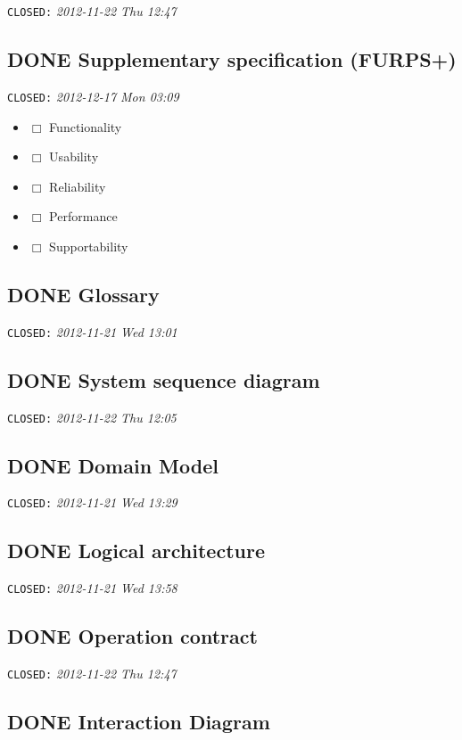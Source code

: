 \documentclass[11pt]{article}
\begin{document}
    \texttt{CLOSED:} \textit{2012-11-22 Thu 12:47}
\subsection{\textbf{DONE} Supplementary specification (FURPS+)}
\label{sec-1-3}

   \texttt{CLOSED:} \textit{2012-12-17 Mon 03:09}

\begin{itemize}
\item $\Box$ Functionality
\item $\Box$ Usability
\item $\Box$ Reliability
\item $\Box$ Performance
\item $\Box$ Supportability
\end{itemize}
\subsection{\textbf{DONE} Glossary}
\label{sec-1-4}

   \texttt{CLOSED:} \textit{2012-11-21 Wed 13:01}
\subsection{\textbf{DONE} System sequence diagram}
\label{sec-1-5}

   \texttt{CLOSED:} \textit{2012-11-22 Thu 12:05}
\subsection{\textbf{DONE} Domain Model}
\label{sec-1-6}

   \texttt{CLOSED:} \textit{2012-11-21 Wed 13:29}
\subsection{\textbf{DONE} Logical architecture}
\label{sec-1-7}

   \texttt{CLOSED:} \textit{2012-11-21 Wed 13:58}
\subsection{\textbf{DONE} Operation contract}
\label{sec-1-8}

   \texttt{CLOSED:} \textit{2012-11-22 Thu 12:47}
\subsection{\textbf{DONE} Interaction Diagram}
\label{sec-1-9}
\end{document}
